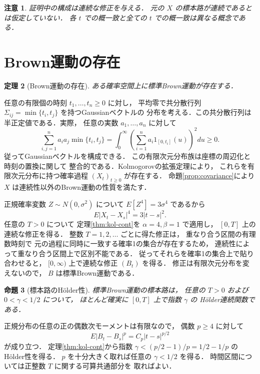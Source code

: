 \documentclass[a5paper,10pt,onecolumn]{jsarticle}
\makeatletter
\theoremstyle{mathnotetheorem}
\newtheorem{theorem}{定理}[section]
\newtheorem{proposition}[theorem]{命題}
\newtheorem{remark}[theorem]{注意}
\renewcommand{\proofname}{証明}
\renewenvironment{proof}[1][\proofname]{%
  \par\pushQED{\qed}\normalfont\topsep4\p@\@plus2\p@\relax
  \trivlist\item[\hskip\labelsep\bfseries #1]\ignorespaces
}{\popQED\endtrivlist\@endpefalse}
\makeatother
\begin{document}
\begin{remark}
証明中の構成は連続な修正を与える．
元の $X$ の標本路が連続であるとは仮定していない．
各 $t$ での概一致と全ての $t$ での概一致は異なる概念である．
\end{remark}

\section{Brown運動の存在}

\begin{theorem}[Brown運動の存在]\label{thm:existence}
ある確率空間上に標準Brown運動が存在する．
\end{theorem}
\begin{proof}
任意の有限個の時刻 $t_1,\dots,t_n\ge0$ に対し，
平均零で共分散行列
$\Sigma_{ij}=\min\{t_i,t_j\}$ を持つGaussianベクトルの
分布を考える．この共分散行列は半正定値である．実際，
任意の実数 $a_1,\dots,a_n$ に対して
\[
 \sum_{i,j=1}^n a_ia_j\min\{t_i,t_j\}
 =\int_0^\infty
   \left(\sum_{i=1}^n a_i1_{[0,t_i]}(u)\right)^2du\ge0.
\]
従ってGaussianベクトルを構成できる．
この有限次元分布族は座標の周辺化と時刻の置換に関して
整合的である．Kolmogorovの拡張定理により，
これらを有限次元分布に持つ確率過程
$(X_t)_{t\ge0}$ が存在する．
命題\ref{prop:covariance}により
$X$ は連続性以外のBrown運動の性質を満たす．

正規確率変数 $Z\sim N(0,\sigma^2)$ について
$E[Z^4]=3\sigma^4$ であるから
\[
 E|X_t-X_s|^4=3|t-s|^2.
\]
任意の $T>0$ について
定理\ref{thm:kol-cont}を $\alpha=4,\beta=1$ で適用し，
$[0,T]$ 上の連続な修正を得る．
整数 $T=1,2,\dots$ ごとに得た修正は，
重なり合う区間の有理数時刻で
元の過程に同時に一致する確率1の集合が存在するため，
連続性によって重なり合う区間上で区別不能である．
従ってそれらを確率1の集合上で貼り合わせると，
$[0,\infty)$ 上で連続な修正 $(B_t)$ を得る．
修正は有限次元分布を変えないので，
$B$ は標準Brown運動である．
\end{proof}

\begin{proposition}[標本路のH\"older性]\label{prop:holder}
標準Brown運動の標本路は，
任意の $T>0$ および $0<\gamma<1/2$ について，
ほとんど確実に $[0,T]$ 上で指数 $\gamma$ の
H\"older連続関数である．
\end{proposition}
\begin{proof}
正規分布の任意の正の偶数次モーメントは有限なので，
偶数 $p\ge4$ に対して
\[
 E|B_t-B_s|^p=C_p|t-s|^{p/2}
\]
が成り立つ．
定理\ref{thm:kol-cont}から指数
$\gamma<(p/2-1)/p=1/2-1/p$ のH\"older性を得る．
$p$ を十分大きく取れば任意の $\gamma<1/2$ を得る．
時間区間については正整数 $T$ に関する可算共通部分を
取ればよい．
\end{proof}
\end{document}

